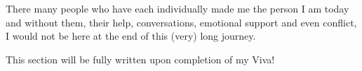 There many people who have each individually made me the person I am today and without them, their help, conversations, emotional support and even conflict, I would not be here at the end of this (very) long journey.

This section will be fully written upon completion of my Viva!

